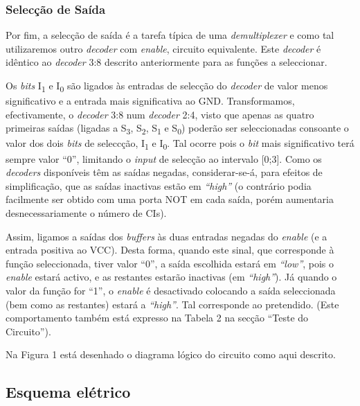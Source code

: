 \documentclass[a4paper,12pt]{article}
\begin{document}
\subsubsection{Selecção de Saída}
Por fim, a selecção de saída é a tarefa típica de uma {\it demultiplexer} 
e como tal utilizaremos outro {\it decoder} com {\it enable}, circuito 
equivalente. Este {\it decoder} é idêntico ao {\it decoder} 3:8 descrito 
anteriormente para as funções a seleccionar.
\par 
Os {\it bits} I\textsubscript{1} e I\textsubscript{0} são ligados às entradas 
de selecção do {\it decoder} de valor menos significativo e a entrada mais 
significativa ao GND. Transformamos, efectivamente, o {\it decoder} 3:8 num 
{\it decoder} 2:4, visto que apenas as quatro primeiras saídas (ligadas a 
S\textsubscript{3}, S\textsubscript{2}, S\textsubscript{1} e 
S\textsubscript{0}) poderão ser seleccionadas consoante o valor dos dois {\it 
bits} de seleccção, I\textsubscript{1} e I\textsubscript{0}. Tal ocorre pois 
o {\it bit} mais significativo terá sempre valor ``0'', limitando o {\it 
input} de selecção ao intervalo [0;3]. Como os {\it decoders} disponíveis 
têm as saídas negadas, considerar-se-á, para efeitos de simplificação, que 
as saídas inactivas estão em {\it ``high''} (o contrário podia facilmente 
ser obtido com uma porta NOT em cada saída, porém aumentaria 
desnecessariamente o número de CIs). 
\par
Assim, ligamos a saídas dos {\it buffers} às duas entradas negadas do {\it 
enable} (e a entrada positiva ao VCC). Desta forma, quando este sinal, que 
corresponde à função seleccionada, tiver valor ``0'', a saída escolhida 
estará em {\it ``low''}, pois o {\it enable} estará activo, e as restantes 
estarão inactivas (em {\it ``high''}). Já quando o valor da função for 
``1'', o {\it enable} é desactivado colocando a saída seleccionada (bem como 
as restantes) estará a {\it ``high''}. Tal corresponde ao pretendido. (Este 
comportamento também está expresso na Tabela 2 na secção ``Teste do 
Circuito'').
\par
Na Figura 1 está desenhado o diagrama lógico do circuito como aqui descrito.

\subsection{Esquema elétrico}
\end{document}
